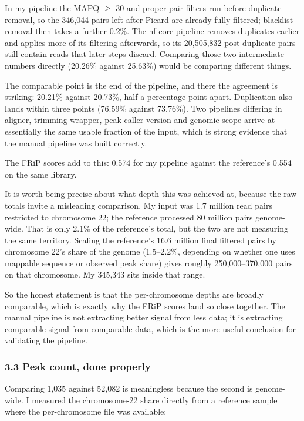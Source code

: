 \documentclass[
  11pt,
  a4paper,
]{article}
\begin{document}
In my pipeline the MAPQ \(\geq\) 30 and proper-pair filters run before
duplicate removal, so the 346,044 pairs left after Picard are already
fully filtered; blacklist removal then takes a further 0.2\%. The
nf-core pipeline removes duplicates earlier and applies more of its
filtering afterwards, so its 20,505,832 post-duplicate pairs still
contain reads that later steps discard. Comparing those two intermediate
numbers directly (20.26\% against 25.63\%) would be comparing different
things.

The comparable point is the end of the pipeline, and there the agreement
is striking: 20.21\% against 20.73\%, half a percentage point apart.
Duplication also lands within three points (76.59\% against 73.76\%).
Two pipelines differing in aligner, trimming wrapper, peak-caller
version and genomic scope arrive at essentially the same usable fraction
of the input, which is strong evidence that the manual pipeline was
built correctly.

The FRiP scores add to this: 0.574 for my pipeline against the
reference's 0.554 on the same library.

It is worth being precise about what depth this was achieved at, because
the raw totals invite a misleading comparison. My input was 1.7 million
read pairs restricted to chromosome 22; the reference processed 80
million pairs genome-wide. That is only 2.1\% of the reference's total,
but the two are not measuring the same territory. Scaling the
reference's 16.6 million final filtered pairs by chromosome 22's share
of the genome (1.5--2.2\%, depending on whether one uses mappable
sequence or observed peak share) gives roughly 250,000--370,000 pairs on
that chromosome. My 345,343 sits inside that range.

So the honest statement is that the per-chromosome depths are broadly
comparable, which is exactly why the FRiP scores land so close together.
The manual pipeline is not extracting better signal from less data; it
is extracting comparable signal from comparable data, which is the more
useful conclusion for validating the pipeline.

\hypertarget{peak-count-done-properly}{%
\subsubsection{3.3 Peak count, done
properly}\label{peak-count-done-properly}}

Comparing 1,035 against 52,082 is meaningless because the second is
genome-wide. I measured the chromosome-22 share directly from a
reference sample where the per-chromosome file was available:
\end{document}
